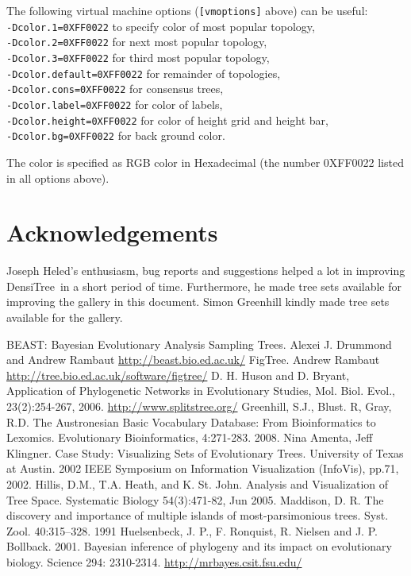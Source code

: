 \documentclass{article}
\def\DensiTree{DensiTree}
\begin{document}
The following virtual machine options ({\tt [vmoptions]} above) can be useful:\\
{\tt -Dcolor.1=0XFF0022} to specify color of most popular topology,\\
{\tt -Dcolor.2=0XFF0022} for next most  popular topology,\\
{\tt -Dcolor.3=0XFF0022} for third most popular topology,\\
{\tt -Dcolor.default=0XFF0022} for remainder of topologies,\\
{\tt -Dcolor.cons=0XFF0022} for consensus trees,\\
{\tt -Dcolor.label=0XFF0022} for color of labels,\\
{\tt -Dcolor.height=0XFF0022} for color of height grid and height bar,\\
{\tt -Dcolor.bg=0XFF0022} for back ground color.

The color is specified as RGB color in Hexadecimal (the number 0XFF0022 listed
in all options above).


\newpage
\section{Acknowledgements}

Joseph Heled's enthusiasm, bug reports and suggestions helped a lot in improving
\DensiTree\ in a short period of time. Furthermore, he made tree sets available for
improving the gallery in this document. Simon Greenhill kindly made tree sets available 
for the gallery.


\begin{thebibliography}{1}
BEAST: Bayesian Evolutionary Analysis Sampling Trees.
           Alexei J. Drummond and Andrew Rambaut
\url{http://beast.bio.ed.ac.uk/}
FigTree. Andrew Rambaut
\url{http://tree.bio.ed.ac.uk/software/figtree/}
D. H. Huson and D. Bryant, Application of Phylogenetic Networks in Evolutionary Studies, Mol. Biol. Evol., 23(2):254-267, 2006.
\url{http://www.splitstree.org/}
Greenhill, S.J., Blust. R, Gray, R.D. The Austronesian Basic Vocabulary Database: From Bioinformatics to Lexomics. Evolutionary Bioinformatics, 4:271-283. 2008.
Nina Amenta, Jeff Klingner.
Case Study: Visualizing Sets of Evolutionary Trees.
University of Texas at Austin.
2002 IEEE Symposium on Information Visualization (InfoVis), pp.71, 2002.
Hillis, D.M., T.A. Heath, and K. St. John.
Analysis and Visualization of Tree Space. 
Systematic Biology 54(3):471-82, Jun 2005.
Maddison, D. R. 
The discovery and importance of multiple islands of most-parsimonious trees. 
Syst. Zool. 40:315–328. 1991
Huelsenbeck, J. P., F. Ronquist, R. Nielsen and J. P. Bollback. 2001. Bayesian inference of phylogeny and its impact on evolutionary biology. Science 294: 2310-2314.
\url{http://mrbayes.csit.fsu.edu/}
\end{thebibliography}
\end{document}
